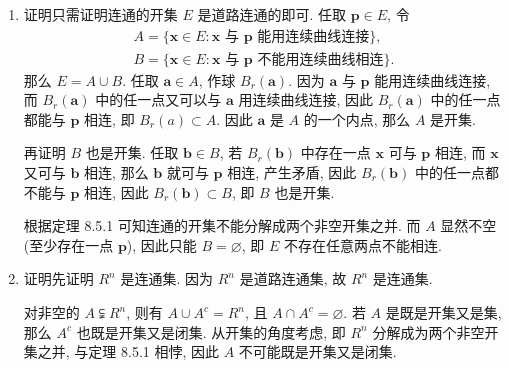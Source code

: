 % 
\begin{enumerate}
    \item %
        {\heiti 证明}\quad 只需证明连通的开集 $E$ 是道路连通的即可. 任取 $\boldsymbol{p} \in E$, 令
        \begin{gather*}
            A = \{\boldsymbol{x} \in E : \text{$\boldsymbol{x}$ 与 $\boldsymbol{p}$ 能用连续曲线连接}\}, \\
            B = \{\boldsymbol{x} \in E : \text{$\boldsymbol{x}$ 与 $\boldsymbol{p}$ 不能用连续曲线相连}\}.
        \end{gather*}
        那么 $E = A \cup B$. 任取 $\boldsymbol{a} \in A$, 作球 $B_r(\boldsymbol{a})$. 因为 $\boldsymbol{a}$ 与 $\boldsymbol{p}$ 能用连续曲线连接, 而 $B_r(\boldsymbol{a})$ 中的任一点又可以与 $\boldsymbol{a}$ 用连续曲线连接,
        因此 $B_r(\boldsymbol{a})$ 中的任一点都能与 $\boldsymbol{p}$ 相连, 即 $B_r(a) \subset A$. 因此 $\boldsymbol{a}$ 是 $A$ 的一个内点, 那么 $A$ 是开集.

        再证明 $B$ 也是开集. 任取 $\boldsymbol{b} \in B$, 若 $B_r(\boldsymbol{b})$ 中存在一点 $\boldsymbol{x}$ 可与 $\boldsymbol{p}$ 相连, 而 $\boldsymbol{x}$ 又可与 $\boldsymbol{b}$ 相连, 那么 $\boldsymbol{b}$ 就可与 $\boldsymbol{p}$ 相连, 产生矛盾,
        因此 $B_r(\boldsymbol{b})$ 中的任一点都不能与 $\boldsymbol{p}$ 相连, 因此 $B_r(\boldsymbol{b}) \subset B$, 即 $B$ 也是开集.
        
        根据定理 8.5.1 可知连通的开集不能分解成两个非空开集之并. 而 $A$ 显然不空 (至少存在一点 $\boldsymbol{p}$), 因此只能 $B = \varnothing$, 即 $E$ 不存在任意两点不能相连.
    \item %
        {\heiti 证明}\quad 先证明 $R^n$ 是连通集. 因为 $R^n$ 是道路连通集, 故 $R^n$ 是连通集.
        
        对非空的 $A \subsetneqq R^n$, 则有 $A \cup A^c = R^n$, 且 $A \cap A^c = \varnothing$. 若 $A$ 是既是开集又是集, 那么 $A^c$ 也既是开集又是闭集.
        从开集的角度考虑, 即 $R^n$ 分解成为两个非空开集之并, 与定理 8.5.1 相悖, 因此 $A$ 不可能既是开集又是闭集.
\end{enumerate}
% 